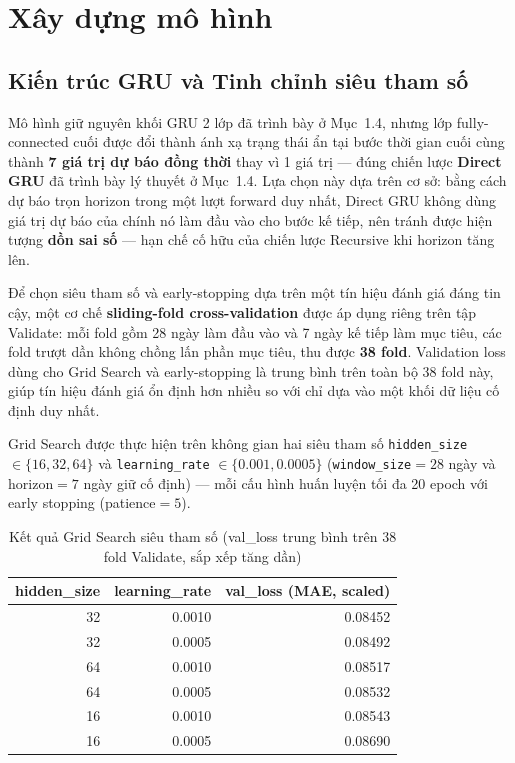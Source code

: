 \documentclass[12pt,oneside]{report}
\begin{document}
\section{Xây dựng mô hình}

\subsection*{Kiến trúc GRU và Tinh chỉnh siêu tham số}

Mô hình giữ nguyên khối GRU 2 lớp đã trình bày ở Mục~1.4, nhưng lớp fully-connected cuối được đổi thành ánh xạ trạng thái ẩn tại bước thời gian cuối cùng thành \textbf{7 giá trị dự báo đồng thời} thay vì 1 giá trị — đúng chiến lược \textbf{Direct GRU} đã trình bày lý thuyết ở Mục~1.4. Lựa chọn này dựa trên cơ sở: bằng cách dự báo trọn horizon trong một lượt forward duy nhất, Direct GRU không dùng giá trị dự báo của chính nó làm đầu vào cho bước kế tiếp, nên tránh được hiện tượng \textbf{dồn sai số} — hạn chế cố hữu của chiến lược Recursive khi horizon tăng lên.

Để chọn siêu tham số và early-stopping dựa trên một tín hiệu đánh giá đáng tin cậy, một cơ chế \textbf{sliding-fold cross-validation} được áp dụng riêng trên tập Validate: mỗi fold gồm 28 ngày làm đầu vào và 7 ngày kế tiếp làm mục tiêu, các fold trượt dần không chồng lấn phần mục tiêu, thu được \textbf{38 fold}. Validation loss dùng cho Grid Search và early-stopping là trung bình trên toàn bộ 38 fold này, giúp tín hiệu đánh giá ổn định hơn nhiều so với chỉ dựa vào một khối dữ liệu cố định duy nhất.

Grid Search được thực hiện trên không gian hai siêu tham số \texttt{hidden\_size} $\in \{16, 32, 64\}$ và \texttt{learning\_rate} $\in \{0.001, 0.0005\}$ (\texttt{window\_size}$=28$ ngày và horizon$=7$ ngày giữ cố định) — mỗi cấu hình huấn luyện tối đa 20 epoch với early stopping (patience$=5$).

\begin{table}[H]
\centering
\caption{Kết quả Grid Search siêu tham số (val\_loss trung bình trên 38 fold Validate, sắp xếp tăng dần)}
\begin{tabular}{rrr}
\toprule
hidden\_size & learning\_rate & val\_loss (MAE, scaled) \\
\midrule
32 & 0.0010 & 0.08452 \\
32 & 0.0005 & 0.08492 \\
64 & 0.0010 & 0.08517 \\
64 & 0.0005 & 0.08532 \\
16 & 0.0010 & 0.08543 \\
16 & 0.0005 & 0.08690 \\
\bottomrule
\end{tabular}
\end{table}
\end{document}
